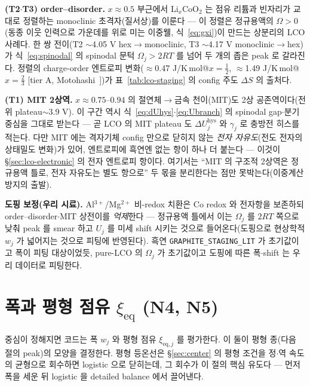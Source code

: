 \documentclass[11pt,a4paper]{article}
\newcommand{\eq}{\mathrm{eq}}
\newcommand{\hys}{\mathrm{hys}}
\newcommand{\code}[1]{\texttt{#1}}
\begin{document}
\textbf{(T2$\cdot$T3) order--disorder.} $x\approx0.5$ 부근에서 $\mathrm{Li}_x\mathrm{CoO_2}$ 는 점유 리튬과 빈자리가
교대로 정렬하는 monoclinic 초격자(질서상)를 이룬다 — 이 정렬은 정규용액의 $\Omega>0$(동종 이웃 인력으로 가운데를 위로
미는 이중웰, 식~\eqref{eq:gxi})이 만드는 상분리의 LCO 사례다. 한 쌍 전이(T2 $\sim$4.05 V hex$\to$monoclinic,
T3 $\sim$4.17 V monoclinic$\to$hex)가 식~\eqref{eq:spinodal} 의 spinodal 문턱 $\Omega_j>2RT$ 를 넘어 두 개의 좁은
peak 로 갈라진다. 정렬의 charge-order 엔트로피 변화($\approx$0.47 J/K\,mol@$x{=}\tfrac12$, $\approx$1.49 J/K\,mol@$x{=}\tfrac23$
[tier A, Motohashi~\cite{motohashi2009}])가 표~\ref{tab:lco-staging} 의 config 주도 $\Delta S$ 의 출처다.

\textbf{(T1) MIT 2상역.} $x\approx0.75$--$0.94$ 의 절연체$\to$금속 천이(MIT)도 2상 공존역이다(전위 plateau$\sim$3.9 V).
이 구간 역시 식~\eqref{eq:dUhys}$\cdot$\eqref{eq:Ubranch} 의 spinodal gap$\cdot$분기 중심을 그대로 받는다 — 곧 LCO 의
MIT plateau 도 $\Delta U_j^\hys$ 와 $\gamma_j$ 로 충방전 히스를 적는다. 다만 MIT 에는 격자기체 config 만으로 닫히지 않는
\emph{전자 자유도}(전도 전자의 상태밀도 변화)가 있어, 엔트로피에 흑연엔 없는 항이 하나 더 붙는다 — 이것이
\S\ref{sec:lco-electronic} 의 전자 엔트로피 항이다. 여기서는 ``MIT 의 구조적 2상역은 정규용액 틀로, 전자 자유도는 별도
항으로'' 두 몫을 분리한다는 점만 못박는다(이중계산 방지의 출발).

\textbf{도핑 보정(우리 시료).} Al$^{3+}$/Mg$^{2+}$ 비-redox 치환은 Co redox 와 전자항을 보존하되 order--disorder$\cdot$MIT
상전이를 \emph{억제}한다 — 정규용액 틀에서 이는 $\Omega_j$ 를 $2RT$ 쪽으로 낮춰 peak 를 smear 하고
$U_j$ 를 미세 shift 시키는 것으로 들어온다(도핑으로 현상학적 $w_j$ 가 넓어지는 것으로 피팅에 반영된다).
흑연 \code{GRAPHITE\_STAGING\_LIT} 가 초기값이고 폭이 피팅 대상이었듯, pure-LCO 의 $\Omega_j$ 가 초기값이고
도핑에 따른 폭$\cdot$shift 는 우리 데이터로 피팅한다.

\section{폭과 평형 점유 $\xi_\eq$ (N4, N5)}\label{sec:width}
중심이 정해지면 코드는 폭 $w_j$ 와 평형 점유 $\xi_{\eq,j}$ 를 평가한다. 이 둘이 평형 종(다음 절의 peak)의 모양을
결정한다. 평형 등온선은 \S\ref{sec:center} 의 평형 조건을 정$\cdot$역 속도의 균형으로 회수하면 logistic 으로 닫히는데,
그 회수가 이 절의 핵심 유도다 — 먼저 폭을 세운 뒤 logistic 을 detailed balance 에서 끌어낸다.
\end{document}
